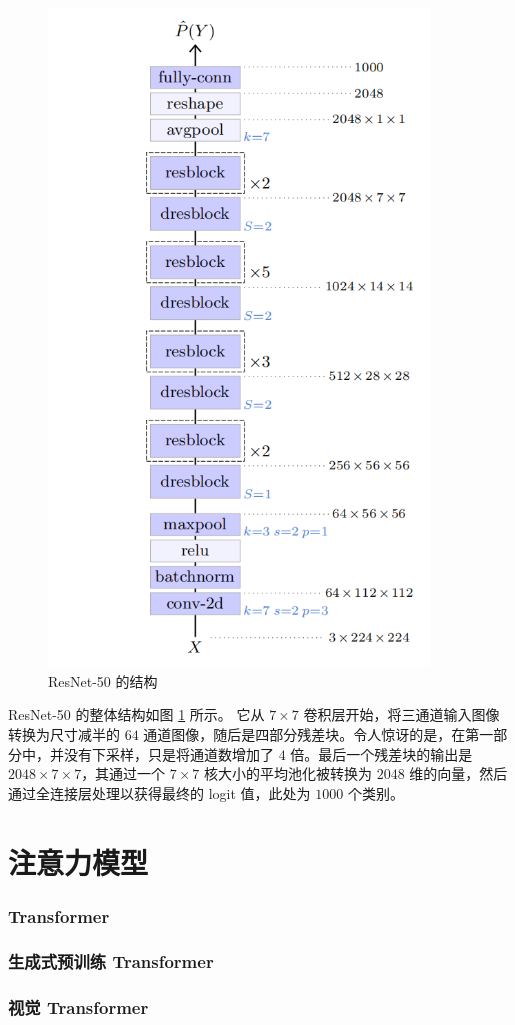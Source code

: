 \begin{figure}
    \centering
    \includegraphics[width=0.9\textwidth]{fig/fig5.5.png}
    \caption[ResNet-50]{ResNet-50 的结构 \citep{arxiv-1512.03385}}
    \label{fig5.5}
\end{figure}

ResNet-50 的整体结构如图 \ref{fig5.5} 所示。 它从 $7 \times 7$ 卷积层开始，将三通道输入图像转换为尺寸减半的 $64$ 通道图像，随后是四部分残差块。令人惊讶的是，在第一部分中，并没有下采样，只是将通道数增加了 $4$ 倍。最后一个残差块的输出是 $2048 \times 7 \times 7$，其通过一个 $7 \times 7$ 核大小的平均池化被转换为 $2048$ 维的向量，然后通过全连接层处理以获得最终的 logit 值，此处为 $1000$ 个类别。

\section{注意力模型}\label{sec5.3}

\subsubsection*{Transformer}

\subsubsection*{生成式预训练 Transformer}

\subsubsection*{视觉 Transformer}